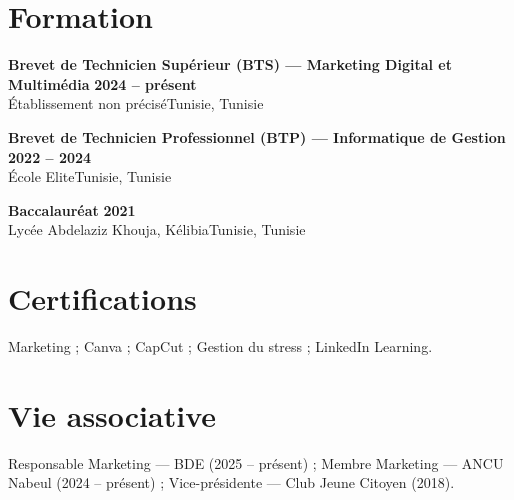 \documentclass[a4paper,10pt]{article}
\newcommand{\cventry}[4]{%
  \textbf{#1} \hfill \textbf{#4}\\[1pt]
  #2{\ifx\relax#3\relax\else, #3\fi}\par\vspace{1.5pt}}
\begin{document}
\section{Formation}
\cventry{Brevet de Technicien Supérieur (BTS) — Marketing Digital et Multimédia}{Établissement non précisé}{Tunisie}{2024 -- présent}
\cventry{Brevet de Technicien Professionnel (BTP) — Informatique de Gestion}{École Elite}{Tunisie}{2022 -- 2024}
\cventry{Baccalauréat}{Lycée Abdelaziz Khouja, Kélibia}{Tunisie}{2021}

\section{Certifications}
Marketing ; Canva ; CapCut ; Gestion du stress ; LinkedIn Learning.

\section{Vie associative}
Responsable Marketing — BDE (2025 -- présent) ; Membre Marketing — ANCU Nabeul (2024 -- présent) ; Vice-présidente — Club Jeune Citoyen (2018).
\end{document}
